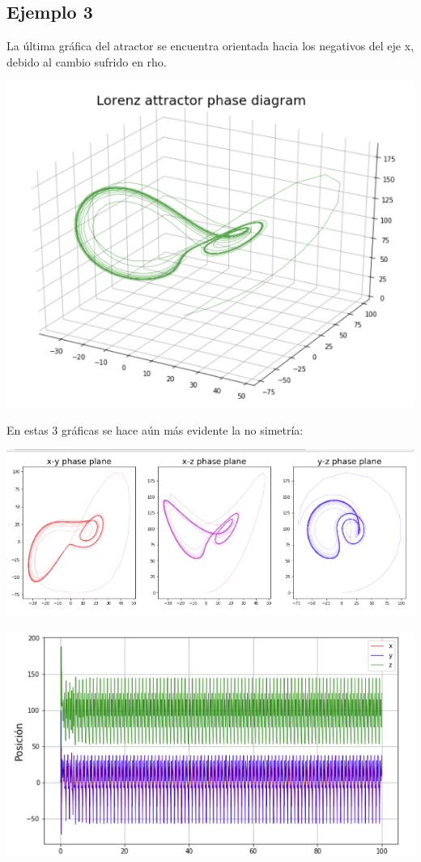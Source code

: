 \documentclass{article}
\begin{document}
\subsection{Ejemplo 3}
La última gráfica del atractor se encuentra orientada hacia los negativos del eje x, debido al cambio sufrido en rho.
\begin{center}
\includegraphics[scale=0.4]{Eval8.png}
\end{center}

En estas 3 gráficas se hace aún más evidente la no simetría:
\begin{center}
\includegraphics[scale=0.5]{Eval9.png}
\end{center}

\begin{center}
\includegraphics[scale=0.]{Eval10.png}
\end{center}
\end{document}
